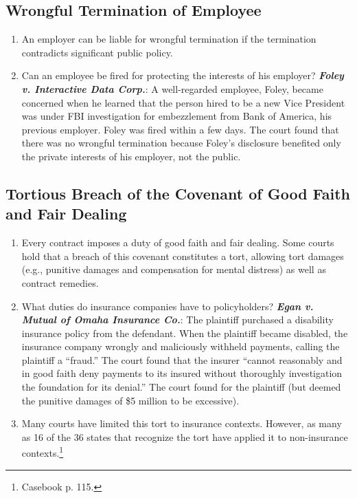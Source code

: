 \subsection{Wrongful Termination of Employee}

\begin{enumerate}
    \item An employer can be liable for wrongful termination if the termination contradicts significant public policy.
    \item Can an employee be fired for protecting the interests of his employer? \textbf{\emph{Foley v. Interactive Data Corp.}}: A well-regarded employee, Foley, became concerned when he learned that the person hired to be a new Vice President was under FBI investigation for embezzlement from Bank of America, his previous employer. Foley was fired within a few days. The court found that there was no wrongful termination because Foley's disclosure benefited only the private interests of his employer, not the public.
\end{enumerate}

\subsection{Tortious Breach of the Covenant of Good Faith and Fair Dealing}

\begin{enumerate}
    \item Every contract imposes a duty of good faith and fair dealing. Some courts hold that a breach of this covenant constitutes a tort, allowing tort damages (e.g., punitive damages and compensation for mental distress) as well as contract remedies.
    \item What duties do insurance companies have to policyholders? \textbf{\emph{Egan v. Mutual of Omaha Insurance Co.}}: The plaintiff purchased a disability insurance policy from the defendant. When the plaintiff became disabled, the insurance company wrongly and maliciously withheld payments, calling the plaintiff a ``fraud.'' The court found that the insurer ``cannot reasonably and in good faith deny payments to its insured without thoroughly investigation the foundation for its denial.'' The court found for the plaintiff (but deemed the punitive damages of \$5 million to be excessive).
    \item Many courts have limited this tort to insurance contexts. However, as many as 16 of the 36 states that recognize the tort have applied it to non-insurance contexts.\footnote{Casebook p. 115.}
\end{enumerate}

